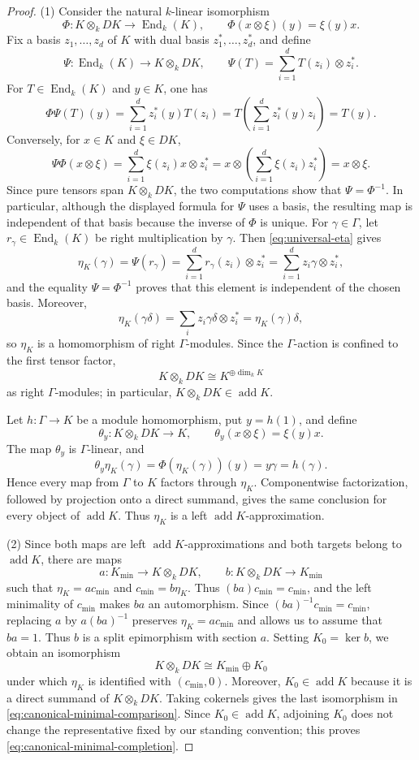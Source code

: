 \documentclass[11pt,reqno]{amsart}
\theoremstyle{definition}
\theoremstyle{remark}
\newcommand{\addc}{\operatorname{add}}
\numberwithin{equation}{section}
\begin{document}
\begin{proof}
\textup{(1)}
Consider the natural $k$-linear isomorphism
\[
 \Phi:K\otimes_kDK\longrightarrow\operatorname{End}_k(K),
 \qquad
 \Phi(x\otimes\xi)(y)=\xi(y)x.
\]
Fix a basis $z_1,\ldots,z_d$ of $K$ with dual basis
$z_1^*,\ldots,z_d^*$, and define
\[
 \Psi:\operatorname{End}_k(K)\longrightarrow K\otimes_kDK,
 \qquad
 \Psi(T)=\sum_{i=1}^dT(z_i)\otimes z_i^*.
\]
For $T\in\operatorname{End}_k(K)$ and $y\in K$, one has
\[
 \Phi\Psi(T)(y)
 =\sum_{i=1}^d z_i^*(y)T(z_i)
 =T\left(\sum_{i=1}^d z_i^*(y)z_i\right)
 =T(y).
\]
Conversely, for $x\in K$ and $\xi\in DK$,
\[
 \Psi\Phi(x\otimes\xi)
 =\sum_{i=1}^d\xi(z_i)x\otimes z_i^*
 =x\otimes\left(\sum_{i=1}^d\xi(z_i)z_i^*\right)
 =x\otimes\xi.
\]
Since pure tensors span $K\otimes_kDK$, the two computations show that
$\Psi=\Phi^{-1}$.  In particular, although the displayed formula for
$\Psi$ uses a basis, the resulting map is independent of that basis because
the inverse of $\Phi$ is unique.  For $\gamma\in\Gamma$, let
$r_\gamma\in\operatorname{End}_k(K)$ be right multiplication by $\gamma$.
Then \eqref{eq:universal-eta} gives
\[
 \eta_K(\gamma)=\Psi(r_\gamma)
 =\sum_{i=1}^d r_\gamma(z_i)\otimes z_i^*
 =\sum_{i=1}^d z_i\gamma\otimes z_i^*,
\]
and the equality $\Psi=\Phi^{-1}$ proves that this element is independent of
the chosen basis.  Moreover,
\[
 \eta_K(\gamma\delta)
 =\sum_i z_i\gamma\delta\otimes z_i^*
 =\eta_K(\gamma)\delta,
\]
so $\eta_K$ is a homomorphism of right $\Gamma$-modules.
Since the $\Gamma$-action is confined to the first tensor factor,
\[
 K\otimes_kDK\cong K^{\oplus\dim_kK}
\]
as right $\Gamma$-modules; in particular, $K\otimes_kDK\in\addc K$.

Let $h:\Gamma\to K$ be a module homomorphism, put $y=h(1)$, and define
\[
 \theta_y:K\otimes_kDK\longrightarrow K,
 \qquad
 \theta_y(x\otimes\xi)=\xi(y)x.
\]
The map $\theta_y$ is $\Gamma$-linear, and
\[
 \theta_y\eta_K(\gamma)
 =\Phi(\eta_K(\gamma))(y)
 =y\gamma
 =h(\gamma).
\]
Hence every map from $\Gamma$ to $K$ factors through $\eta_K$.
Componentwise factorization, followed by projection onto a direct summand,
gives the same conclusion for every object of $\addc K$.  Thus $\eta_K$ is
a left $\addc K$-approximation.

\textup{(2)}
Since both maps are left
$\addc K$-approximations and both targets belong to $\addc K$, there are maps
\[
 a:K_{\min}\longrightarrow K\otimes_kDK,
 \qquad
 b:K\otimes_kDK\longrightarrow K_{\min}
\]
such that $\eta_K=ac_{\min}$ and $c_{\min}=b\eta_K$.  Thus
$(ba)c_{\min}=c_{\min}$, and the left minimality of $c_{\min}$ makes $ba$ an
automorphism.  Since $(ba)^{-1}c_{\min}=c_{\min}$, replacing $a$ by
$a(ba)^{-1}$ preserves $\eta_K=ac_{\min}$ and allows us to assume that
$ba=1$.  Thus $b$ is a split epimorphism with section $a$.  Setting
$K_0=\ker b$, we obtain an isomorphism
\[
 K\otimes_kDK\cong K_{\min}\oplus K_0
\]
under which $\eta_K$ is identified with $(c_{\min},0)$.  Moreover,
$K_0\in\addc K$ because it is a direct summand of $K\otimes_kDK$.  Taking
cokernels gives the last isomorphism in
\eqref{eq:canonical-minimal-comparison}.  Since $K_0\in\addc K$, adjoining
$K_0$ does not change the representative fixed by our standing convention;
this proves \eqref{eq:canonical-minimal-completion}.
\end{proof}
\end{document}
